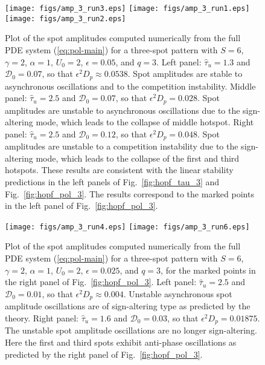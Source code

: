 \documentclass{article}%
\begin{document}
\begin{figure}[htbp]
\centering
\texttt{[image: figs/amp\_3\_run3.eps]}
\texttt{[image: figs/amp\_3\_run1.eps]}
\texttt{[image: figs/amp\_3\_run2.eps]}
\caption{\label{fig:valid_3spot_q3} Plot of the spot amplitudes
  computed numerically from the full PDE system (\ref{eq:pol-main})
  for a three-spot pattern with $S=6$, $\gamma=2$, $\alpha=1$,
  $U_0=2$, $\epsilon=0.05$, and $q=3$.  Left panel: $\hat{\tau}_u=1.3$
  and ${\mathcal D}_0=0.07$, so that $\epsilon^2 D_p\approx
  0.0538$. Spot amplitudes are stable to asynchronous oscillations and
  to the competition instability.  Middle panel: $\hat{\tau}_u=2.5$
  and ${\mathcal D}_0=0.07$, so that $\epsilon^2 D_p=0.028$.  Spot
  amplitudes are unstable to asynchronous oscillations due to the
  sign-altering mode, which leads to the collapse of middle
  hotspot. Right panel: $\hat{\tau}_u=2.5$ and ${\mathcal D}_0=0.12$,
  so that $\epsilon^2 D_p=0.048$. Spot amplitudes are unstable to a
  competition instability due to the sign-altering mode, which leads
  to the collapse of the first and third hotspots. These results are
  consistent with the linear stability predictions in the left panels
  of Fig.~\ref{fig:hopf_tau_3} and Fig.~\ref{fig:hopf_pol_3}.  The
  results correspond to the marked points in the left panel of
  Fig.~\ref{fig:hopf_pol_3}. }
\end{figure}

\begin{figure}[htbp]
\centering
\texttt{[image: figs/amp\_3\_run4.eps]}
\texttt{[image: figs/amp\_3\_run6.eps]}
\caption{\label{fig:valid_3spot_q3_b} Plot of the spot amplitudes
  computed numerically from the full PDE system (\ref{eq:pol-main})
  for a three-spot pattern with $S=6$, $\gamma=2$, $\alpha=1$,
  $U_0=2$, $\epsilon=0.025$, and $q=3$, for the marked points in the
  right panel of Fig.~\ref{fig:hopf_pol_3}. Left panel:
  $\hat{\tau}_u=2.5$ and ${\mathcal D}_0=0.01$, so that $\epsilon^2
  D_p\approx 0.004$. Unstable asynchronous spot amplitude oscillations
  are of sign-altering type as predicted by the theory. Right panel:
  $\hat{\tau}_u=1.6$ and ${\mathcal D}_0=0.03$, so that $\epsilon^2
  D_p=0.01875$.  The unstable spot amplitude oscillations are no
  longer sign-altering. Here the first and third spots exhibit
  anti-phase oscillations as predicted by the right panel of
  Fig.~\ref{fig:hopf_pol_3}.}
\end{figure}
\end{document}
